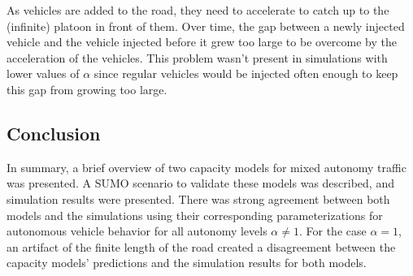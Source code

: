 \documentclass[11pt,nofootinbib]{revtex4}
\begin{document}
As vehicles are added to the road, they need to accelerate to catch up to the (infinite) platoon in front of them. Over time, the gap between a newly injected vehicle and the vehicle injected before it grew too large to be overcome by the acceleration of the vehicles. This problem wasn't present in simulations with lower values of $\alpha$ since regular vehicles would be injected often enough to keep this gap from growing too large.

\subsection{Conclusion}

In summary, a brief overview of two capacity models for mixed autonomy traffic was presented. A SUMO scenario to validate these models was described, and simulation results were presented. There was strong agreement between both models and the simulations using their corresponding parameterizations for autonomous vehicle behavior for all autonomy levels $\alpha \neq 1$. For the case $\alpha = 1$, an artifact of the finite length of the road created a disagreement between the capacity models' predictions and the simulation results for both models.
\end{document}
